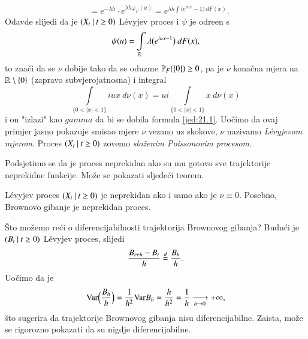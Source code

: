 \begin{pr}
\begin{equation}
\begin{aligned}
            &= e^{-\lambda h} \cdot e^{\lambda h \varphi_F (u)} = e^{\lambda h \int \big( e^{i u x} - 1 \big) \: d F (x)}.
        \end{aligned}
    \end{equation}
    Odavde slijedi da je $({X_t} \: | \: {t \geq 0})$ L\' evyjev proces i $\psi$ je odre\dj en s
    \begin{equation}    \label{jed:21.13}
        \psi (u) = \int\limits_{\mathbb{R}} \lambda \big( e^{i u x - 1} \big) \: d F (x),
    \end{equation}
    to zna\v ci da se $\nu$ dobije tako da se oduzme $\mathbb{P}_F (\{0\}) \geq 0$, pa je $\nu$ kona\v cna mjera na $\mathbb{R} \setminus \{0\}$ (zapravo subvjerojatnosna) i integral
    \begin{equation*}
        \int\limits_{\{ 0 < |x| < 1 \}} i u x \: d \nu (x) = u i \int\limits_{\{ 0 < |x| < 1 \}} x \: d \nu (x)
    \end{equation*}
    i on "izlazi" kao $gamma$ da bi se dobila formula \eqref{jed:21.1}.
    Uo\v cimo da ovaj primjer jasno pokazuje smisao mjere $\nu$ vezano uz skokove, $\nu$ nazivamo \emph{L\' evyjevom mjerom}.
    Proces $({X_t} \: | \: {t \geq 0})$ zovemo \emph{slo\v zenim Poissonovim procesom}.
\end{pr}

Podsjetimo se da je proces neprekidan ako su mu gotovo sve trajektorije neprekidne funkcije.
Mo\v ze se pokazati sljede\' ci teorem.

\begin{tm}  \label{tm:21.14}
    L\' evyjev proces $({X_t} \: | \: {t \geq 0})$ je neprekidan ako i samo ako je $\nu \equiv 0$.
    Posebno, Brownovo gibanje je neprekidan proces.
\end{tm}

\begin{nap} \label{nap:21.15}
    \v Sto mo\v zemo re\' ci o diferencijabilnosti trajektorija Brownovog gibanja?
    Budu\' ci je $({B_t} \: | \: {t \geq 0})$ L\' evyjev proces, slijedi
    \begin{equation*}
        \frac{B_{t + h} - B_t}{h} \overset{d}{=} \frac{B_h}{h}.
    \end{equation*}
    Uo\v cimo da je
    \begin{equation*}
        \mathrm{Var} \Big( \frac{B_h}{h} \Big) = \frac{1}{h^2} \mathrm{Var} B_h = \frac{h}{h^2} = \frac{1}{h} \xrightarrow[h \to 0]{} +\infty,
    \end{equation*}
    \v sto sugerira da trajektorije Brownovog gibanja nisu diferencijabilne.
    Zaista, mo\v ze se rigorozno pokazati da su nigdje diferencijabilne.
\end{nap}

